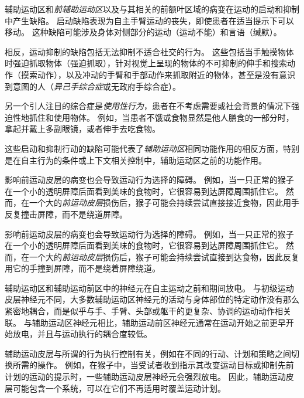 \begin{proposition} \label{box:34_2}
	
	\quad \quad 辅助运动区和\textit{前辅助运动区}以及与其相关的前额叶区域的病变在运动的启动和抑制中产生缺陷。
	启动缺陷表现为自主手臂运动的丧失，即使患者在适当提示下可以移动。
	这种缺陷可能涉及身体对侧部分的运动（运动不能）和言语（缄默）。
	
	\quad \quad 相反，运动抑制的缺陷包括无法抑制不适合社交的行为。
	这些包括当手触摸物体时强迫抓取物体（强迫抓取），针对视觉上呈现的物体的不可抑制的伸手和搜索动作（摸索动作），以及冲动的手臂和手部动作来抓取附近的物体，甚至是没有意识到意图的人（\textit{异己手综合症}或无政府手综合症）。
	
	\quad \quad 另一个引人注目的综合症是\textit{使用性行为}，患者在不考虑需要或社会背景的情况下强迫性地抓住和使用物体。
	例如，当患者不饿或食物显然是他人膳食的一部分时，拿起并戴上多副眼镜，或者伸手去吃食物。
	
	\quad \quad 这些启动和抑制行动的缺陷可能代表了\textit{辅助运动区}相同功能作用的相反方面，特别是在自主行为的条件或上下文相关控制中，辅助运动区之前的功能作用。
	
	\quad \quad 影响前运动皮层的病变也会导致运动行为选择的障碍。
	例如，当一只正常的猴子在一个小的透明屏障后面看到美味的食物时，它很容易到达屏障周围抓住它。
	然而，在一个大的\textit{前运动皮层}损伤后，猴子可能会持续尝试直接接近食物，因此用手反复撞击屏障，而不是绕道屏障。
	
	\quad \quad 影响前运动皮层的病变也会导致运动行为选择的障碍。
	例如，当一只正常的猴子在一个小的透明屏障后面看到美味的食物时，它很容易到达屏障周围抓住它。
	然而，在一个大的\textit{前运动皮层}损伤后，猴子可能会持续尝试直接到达食物，因此反复用它的手撞到屏障，而不是绕着屏障绕道。
	
\end{proposition}


辅助运动区和辅助运动前区中的神经元在自主运动之前和期间放电。
与初级运动皮层神经元不同，大多数辅助运动区神经元的活动与身体部位的特定动作没有那么紧密地耦合，而是似乎与手、手臂、头部或躯干的更复杂、协调的运动动作相关联。
与辅助运动区神经元相比，辅助运动前区神经元通常在运动开始之前更早开始放电，并且与运动执行的耦合度较低。


辅助运动皮层与所谓的行为执行控制有关，例如在不同的行动、计划和策略之间切换所需的操作。
例如，在猴子中，当受试者收到指示其改变运动目标或抑制先前计划的运动的提示时，一些辅助运动皮层神经元会强烈放电。
因此，辅助运动皮层可能包含一个系统，可以在它们不再适用时覆盖运动计划。


